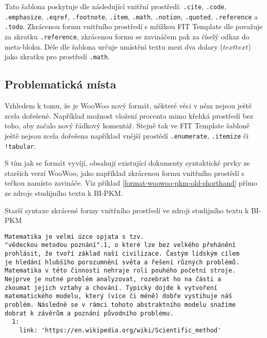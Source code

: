 \begin{sloppypar}
Tato šablona poskytuje dle \cite{woowoo} následující vnitřní prostředí: \texttt{.cite}, \texttt
{.code}, \texttt{.emphasize}, \texttt{.eqref}, \texttt{.footnote}, \texttt
{.item}, \texttt{.math}, \texttt{.notion}, \texttt{.quoted}, \texttt{.reference}
a \texttt{.todo}. Zkrácenou formu vnitřního prostředí s mřížkou FIT Template dle \cite{woowoo} považuje za
zkratku \texttt{.reference}, zkrácenou formu se zavináčem pak za číselý odkaz do meta-bloku. Déle dle
\cite{woowoo} šablona určuje umístění textu mezi dva dolary (\texttt{$text text$}) jako zkratku pro prostředí
\texttt{.math}.
\end{sloppypar}

\subsection{Problematická místa}

Vzhledem k tomu, že je WooWoo nový formát, některé věci v něm nejsou ještě zcela dořešené. Například možnost vložení
procenta mimo křehká prostředí bez toho, aby začalo nový řádkový komentář. Stejně tak ve FIT Template šabloně ještě
nejsou zcela dořešena například vnější prostědí \texttt{.enumerate}, \texttt{.itemize} či
\texttt{!tabular}.

S tím jak se formát vyvíjí, obsahují existující dokumenty syntaktické prvky ze starších verzí WooWoo, jako například
zkrácenou formu vnitřního prostědí s tečkou namísto zavináče. Viz příklad \ref{format-woowoo-pkm-old-shorthand} přímo ze
zdroje studijního textu k BI-PKM.

\begin{listing}
    \caption{Starší syntaxe zkrácené formy vnitřního prostředí ve zdroji studijního textu k BI-PKM \cite{pkm}}
    \label{format-woowoo-pkm-old-shorthand}
    \begin{verbatim}
Matematika je velmi úzce spjata s tzv.
"vědeckou metodou poznání".1, o které lze bez velkého přehánění
prohlásit, že tvoří základ naší civilizace. Častým lidským cílem
je hledání hlubšího porozumnění světa a řešení různých problémů.
Matematika v této činnosti nehraje roli pouhého početní stroje.
Nejprve je nutné problém analyzovat, rozebrat ho na části a
zkoumat jejich vztahy a chování. Typicky dojde k vytvoření
matematického modelu, který (více či méně) dobře vystihuje náš
problém. Následně se v rámci tohoto abstraktního modelu snažíme
dobrat k závěrům a poznání původního problému.
  1:
    link: 'https://en.wikipedia.org/wiki/Scientific_method'
    \end{verbatim}
\end{listing}


